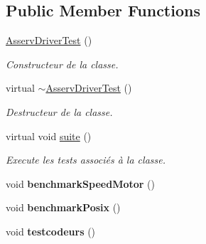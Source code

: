 \subsection*{Public Member Functions}
\begin{DoxyCompactItemize}
\item 
\mbox{\label{classtest_1_1AsservDriverTest_a03cb45e77afe617672bfcba8792e9d1c}} 
\hyperlink{classtest_1_1AsservDriverTest_a03cb45e77afe617672bfcba8792e9d1c}{Asserv\+Driver\+Test} ()
\begin{DoxyCompactList}\small\item\em Constructeur de la classe. \end{DoxyCompactList}\item 
\mbox{\label{classtest_1_1AsservDriverTest_a3a27fd8bac6f5045ac642f9614634a79}} 
virtual \hyperlink{classtest_1_1AsservDriverTest_a3a27fd8bac6f5045ac642f9614634a79}{$\sim$\+Asserv\+Driver\+Test} ()
\begin{DoxyCompactList}\small\item\em Destructeur de la classe. \end{DoxyCompactList}\item 
\mbox{\label{classtest_1_1AsservDriverTest_a782609b9420c0545469a434920b51c62}} 
virtual void \hyperlink{classtest_1_1AsservDriverTest_a782609b9420c0545469a434920b51c62}{suite} ()
\begin{DoxyCompactList}\small\item\em Execute les tests associés à la classe. \end{DoxyCompactList}\item 
\mbox{\label{classtest_1_1AsservDriverTest_a93860e8f294f8e90f33dfb4f3031fa91}} 
void {\bfseries benchmark\+Speed\+Motor} ()
\item 
\mbox{\label{classtest_1_1AsservDriverTest_a0d1c0418c9a08ade79458293463dc9d2}} 
void {\bfseries benchmark\+Posix} ()
\item 
\mbox{\label{classtest_1_1AsservDriverTest_ac334ea442e3e24d8f8980790e6e0d621}} 
void {\bfseries testcodeurs} ()
\item 
\mbox{\label{classtest_1_1AsservDriverTest_ae5e5189aa316143360d19092dc3d5796}} 

\end{DoxyCompactItemize}

